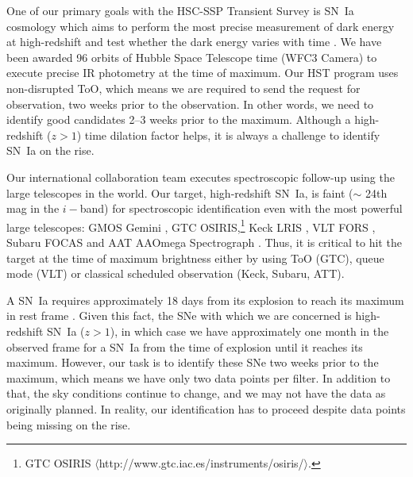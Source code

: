 \documentclass[useamsfonts]{pasj01}
\begin{document}
One of our primary goals with the HSC-SSP Transient Survey is SN~Ia cosmology which aims to perform the most precise measurement of dark energy at high-redshift and test whether the dark energy varies with time \citep{linder03b}.
We have been awarded 96 orbits of Hubble Space Telescope time (WFC3 Camera) to execute precise IR photometry at the time of maximum.
Our HST program uses non-disrupted ToO, which means we are required to send the request for observation, two weeks prior to the observation.
In other words, we need to identify good candidates 2--3 weeks prior to the maximum. Although a high-redshift ($z>1$) time dilation factor helps, it is always a challenge to identify SN~Ia on the rise.

Our international collaboration team executes spectroscopic follow-up using the large telescopes in the world. 
Our target, high-redshift SN~Ia, is faint ($\sim$ 24th mag in the $i-$band) for spectroscopic identification even with the most powerful large telescopes: GMOS Gemini \citep{hook04a}, GTC OSIRIS,\footnote{GTC OSIRIS $\langle$http://www.gtc.iac.es/instruments/osiris/$\rangle$.} Keck LRIS \citep{oke95a}, VLT FORS \citep{appenzeller98a}, Subaru FOCAS \citep{kashikawa02a} and AAT AAOmega Spectrograph \citep{Saunders2004}.  
Thus, it is critical to hit the target at the time of maximum brightness either by using ToO (GTC), queue mode (VLT) or classical scheduled observation (Keck, Subaru, ATT).

A SN~Ia requires approximately 18 days from its explosion to reach its maximum in rest frame \citep{conley06a,papadogiannakis19a}. 
Given this fact, the SNe with which we are concerned is high-redshift SN~Ia ($z>1$), in which case we have approximately one month in the observed frame for a SN~Ia from the time of explosion until it reaches its maximum.
However, our task is to identify these SNe two weeks prior to the maximum, which means we have only two data points per filter. In addition to that, the sky conditions continue to change, and we may not have the data as originally planned. In reality, our identification has to proceed despite data points being missing on the rise.
\end{document}
